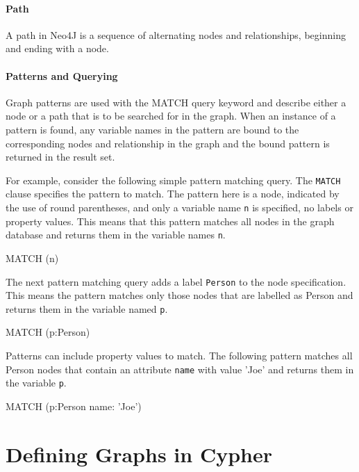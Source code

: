 \paragraph*{Path}
A path in Neo4J is a sequence of alternating nodes and relationships, beginning and ending with a node.

\paragraph*{Patterns and Querying}

Graph patterns are used with the MATCH query keyword and describe either a node or a path that is to be searched for in the graph. When an instance of a pattern is found, any variable names in the pattern are bound to the corresponding nodes and relationship in the graph and the bound pattern is returned in the result set.

For example, consider the following simple pattern matching query. The \texttt{MATCH} clause specifies the pattern to match. The pattern here is a node, indicated by the use of round parentheses, and only a variable name \texttt{n} is specified, no labels or property values. This means that this pattern matches all nodes in the graph database and returns them in the variable names \texttt{n}.

\begin{cyphercode}
MATCH (n)
\end{cyphercode}

The next pattern matching query adds a label \texttt{Person} to the node specification. This means the pattern matches only those nodes that are labelled as Person and returns them in the variable named \texttt{p}.

\begin{cyphercode}
MATCH (p:Person)
\end{cyphercode}

Patterns can include property values to match. The following pattern matches all Person nodes that contain an attribute \texttt{name} with value 'Joe' and returns them in the variable \texttt{p}.

\begin{cyphercode}
MATCH (p:Person {name: 'Joe'})
\end{cyphercode}


\section{Defining Graphs in Cypher}


